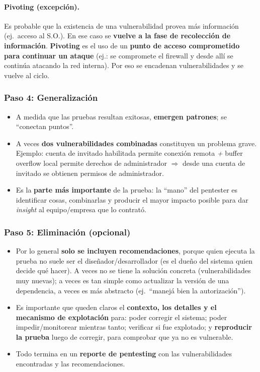 \documentclass[../main.tex]{subfiles}
\begin{document}
\paragraph{Pivoting (excepción).} Es probable que la existencia de una vulnerabilidad provea
más información (ej.\ acceso al S.O.). En ese caso se \textbf{vuelve a la fase de recolección
de información}. \textbf{Pivoting} es el uso de un \textbf{punto de acceso comprometido para
continuar un ataque} (ej.: se compromete el firewall y desde allí se continúa atacando la
red interna). Por eso se encadenan vulnerabilidades y se vuelve al ciclo.

\subsubsection{Paso 4: Generalización}

\begin{itemize}
    \item A medida que las pruebas resultan exitosas, \textbf{emergen patrones}; se ``conectan
    puntos''.
    \item A veces \textbf{dos vulnerabilidades combinadas} constituyen un problema grave.
    Ejemplo: cuenta de invitado habilitada permite conexión remota \emph{+} buffer overflow
    local permite derechos de administrador $\Rightarrow$ desde una cuenta de invitado se
    obtienen permisos de administrador.
    \item Es la \textbf{parte más importante} de la prueba: la ``mano'' del pentester es
    identificar cosas, combinarlas y producir el mayor impacto posible para dar \emph{insight}
    al equipo/empresa que lo contrató.
\end{itemize}

\subsubsection{Paso 5: Eliminación (opcional)}

\begin{itemize}
    \item Por lo general \textbf{solo se incluyen recomendaciones}, porque quien ejecuta la
    prueba no suele ser el diseñador/desarrollador (es el dueño del sistema quien decide qué
    hacer). A veces no se tiene la solución concreta (vulnerabilidades muy nuevas); a veces
    es tan simple como actualizar la versión de una dependencia, a veces es más abstracto
    (ej.\ ``manejá bien la autorización'').
    \item Es importante que queden claros el \textbf{contexto, los detalles y el mecanismo de
    explotación} para: poder corregir el sistema; poder impedir/monitorear mientras tanto;
    verificar si fue explotado; y \textbf{reproducir la prueba} luego de corregir, para
    comprobar que ya no es vulnerable.
    \item Todo termina en un \textbf{reporte de pentesting} con las vulnerabilidades
    encontradas y las recomendaciones.
\end{itemize}
\end{document}
